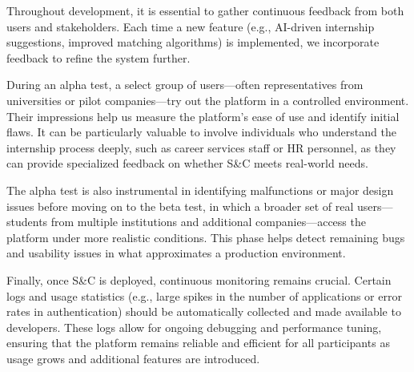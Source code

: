 Throughout development, it is essential to gather continuous feedback from both users and stakeholders. Each time a new feature (e.g., AI-driven internship suggestions, improved matching algorithms) is implemented, we incorporate feedback to refine the system further.

During an alpha test, a select group of users—often representatives from universities or pilot companies—try out the platform in a controlled environment. Their impressions help us measure the platform’s ease of use and identify initial flaws. It can be particularly valuable to involve individuals who understand the internship process deeply, such as career services staff or HR personnel, as they can provide specialized feedback on whether S\&C meets real-world needs.

The alpha test is also instrumental in identifying malfunctions or major design issues before moving on to the beta test, in which a broader set of real users—students from multiple institutions and additional companies—access the platform under more realistic conditions. This phase helps detect remaining bugs and usability issues in what approximates a production environment.

Finally, once S\&C is deployed, continuous monitoring remains crucial. Certain logs and usage statistics (e.g., large spikes in the number of applications or error rates in authentication) should be automatically collected and made available to developers. These logs allow for ongoing debugging and performance tuning, ensuring that the platform remains reliable and efficient for all participants as usage grows and additional features are introduced.
